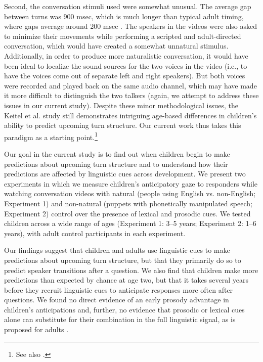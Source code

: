 \documentclass[authoryear, 12pt]{elsarticle}
\begin{document}
Second, the conversation stimuli \citet{keitel2013} used were somewhat unusual. The average gap between turns was 900 msec, which is much longer than typical adult timing, where gaps average around 200 msec \citep{stivers2009}. The speakers in the videos were also asked to minimize their movements while performing a scripted and adult-directed conversation, which would have created a somewhat unnatural stimulus. Additionally, in order to produce more naturalistic conversation, it would have been ideal to localize the sound sources for the two voices in the video (i.e., to have the voices come out of separate left and right speakers). But both voices were recorded and played back on the same audio channel, which may have made it more difficult to distinguish the two talkers (again, we attempt to address these issues in our current study). Despite these minor methodological issues, the Keitel et al. \citeyearpar{keitel2013} study still demonstrates intriguing age-based differences in children's ability to predict upcoming turn structure. Our current work thus takes this paradigm as a starting point.\footnote{See also \citet{casillas2012, casillas2013}.} 

Our goal in the current study is to find out when children begin to make predictions about upcoming turn structure and to understand how their predictions are affected by linguistic cues across development. We present two experiments in which we measure children's anticipatory gaze to responders while watching conversation videos with natural (people using English vs. non-English; Experiment 1) and non-natural (puppets with phonetically manipulated speech; Experiment 2) control over the presence of lexical and prosodic cues. We tested children across a wide range of ages (Experiment 1: 3--5 years; Experiment 2: 1--6 years), with adult control participants in each experiment.

Our findings suggest that children and adults use linguistic cues to make predictions about upcoming turn structure, but that they primarily do so to predict speaker transitions after a question. We also find that children make more predictions than expected by chance at age two, but that it takes several years before they recruit linguistic cues to anticipate responses more often after questions. We found no direct evidence of an early prosody advantage in children's anticipations and, further, no evidence that prosodic or lexical cues alone can substitute for their combination in the full linguistic signal, as is proposed for adults \citep{de-ruiter2006}.
\end{document}
